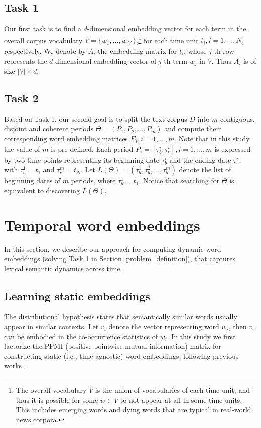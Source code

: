\documentclass[output=paper]{langsci/langscibook}
\begin{document}
\subsection{Task 1} 
Our first task is to find a $d$-dimensional embedding vector for each term in the overall corpus vocabulary $V = \{w_{1}, ..., w_{|V|}\}$,\footnote{The overall vocabulary $V$ is the union of vocabularies of each time unit, and thus it is possible for some $w \in V$ to not appear at all in some time units. This includes emerging words and dying words that are typical in real-world news corpora.} for each time unit $t_{i}, i = 1, ..., N$, respectively. We denote by $A_{i}$ the embedding matrix for $t_{i}$, whose $j$-th row represents the $d$-dimensional embedding vector of $j$-th term $w_{j}$ in $V$. Thus $A_{i}$ is of size $|V| \times d$. 

\subsection{Task 2} 
Based on Task 1, our second goal is to split the text corpus $D$ into $m$ contiguous, disjoint and coherent periods $\Theta =(P_{1}, P_{2}, ..., P_{m})$ and compute their corresponding word embedding matrices $E_{i}, i = 1, ..., m$. Note that in this study the value of $m$ is pre-defined. Each period $P_{i} = [\tau_{b}^{i}, \tau_{e}^{i}], i = 1, ..., m$ is expressed by two time points representing its beginning date $\tau_{b}^{i}$ and the ending date $\tau_{e}^{i}$, with $\tau_{b}^{1} = t_{1}$ and $\tau_{e}^{m} = t_{N}$. Let $L(\Theta) = (\tau_{b}^{1}, \tau_{b}^{2}, ..., \tau_{b}^{m})$ denote the list of beginning dates of $m$ periods, where $\tau_{b}^{1} = t_{1}$. Notice that searching for $\Theta$ is equivalent to discovering $L(\Theta)$. 

\section{Temporal word embeddings}
\label{Temporal word embeddings}

In this section, we describe our approach for computing dynamic word embeddings (solving Task 1 in Section \ref{problem_definition}), that captures lexical semantic dynamics across time.

\subsection{Learning static embeddings}
The distributional hypothesis \citep{firth1957} states that semantically similar words usually appear in similar contexts. Let $v_{i}$ denote the vector representing word $w_{i}$, then $v_{i}$ can be embodied in the co-occurrence statistics of $w_{i}$. In this study we first factorize the PPMI (positive pointwise mutual information) matrix for constructing static (i.e., time-agnostic) word embeddings, following previous works \citep{yao2018dynamic,levy2014neural,hamilton-etal-2016-diachronic}. 
\end{document}
